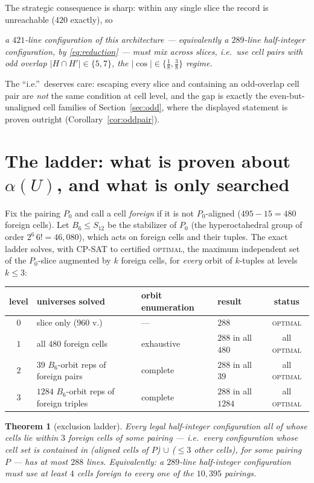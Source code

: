 \documentclass[11pt]{article}
\newtheorem{theorem}{Theorem}
\theoremstyle{remark}
\begin{document}
The strategic consequence is sharp: within any single slice the record is
unreachable ($420$ exactly), so
\begin{center}
\emph{a $421$-line configuration of this architecture --- equivalently a
$289$-line half-integer configuration, by \eqref{eq:reduction} --- must
mix across slices, i.e.\ use cell pairs with odd overlap
$|H\cap H'|\in\{5,7\}$, the $|\cos|\in\{\tfrac18,\tfrac38\}$ regime.}
\end{center}
The ``i.e.''\ deserves care: escaping every slice and containing an
odd-overlap cell pair are \emph{not} the same condition at cell level, and
the gap is exactly the even-but-unaligned cell families of
Section~\ref{sec:odd}, where the displayed statement is proven outright
(Corollary~\ref{cor:oddpair}).

\section{The ladder: what is proven about $\alpha(U)$, and what is only
searched}\label{sec:ladder}

Fix the pairing $P_0$ and call a cell \emph{foreign} if it is not
$P_0$-aligned ($495-15=480$ foreign cells). Let
$B_6\le S_{12}$ be the stabilizer of $P_0$ (the hyperoctahedral group of
order $2^6\,6!=46{,}080$), which acts on foreign cells and their tuples.
The exact ladder solves, with CP-SAT to certified \textsc{optimal}, the
maximum independent set of the $P_0$-slice augmented by $k$ foreign cells,
for \emph{every} orbit of $k$-tuples at levels $k\le3$:

\begin{center}
\begin{tabular}{@{}clllc@{}}
\toprule
level & universes solved & orbit enumeration & result & status \\
\midrule
$0$ & slice only ($960$ v.) & --- & $288$ & \textsc{optimal} \\
$1$ & all $480$ foreign cells & exhaustive & $288$ in all $480$ & all \textsc{optimal} \\
$2$ & $39$ $B_6$-orbit reps of foreign pairs & complete & $288$ in all $39$ & all \textsc{optimal} \\
$3$ & $1284$ $B_6$-orbit reps of foreign triples & complete & $288$ in all $1284$ & all \textsc{optimal} \\
\bottomrule
\end{tabular}
\end{center}

\begin{theorem}[exclusion ladder]\label{thm:ladder}
Every legal half-integer configuration all of whose cells lie within $3$
foreign cells of some pairing --- i.e.\ every configuration whose cell set
is contained in (aligned cells of $P$) $\cup$ ($\le3$ other cells), for
some pairing $P$ --- has at most $288$ lines. Equivalently: a $289$-line
half-integer configuration must use at least $4$ cells foreign to
\emph{every} one of the $10{,}395$ pairings.
\end{theorem}
\end{document}
